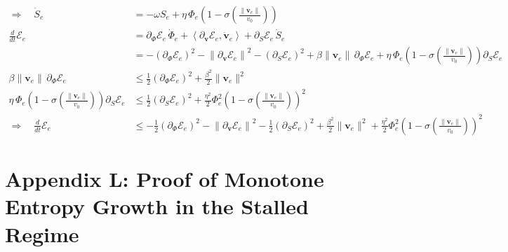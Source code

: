 \documentclass[11pt,oneside]{article}
\begin{document}
\begin{align}
\Rightarrow\quad
\dot{S}_e
&=
-\omega S_e
+
\eta\,\Phi_e
\left(1-\sigma\!\left(\frac{\|\mathbf{v}_e\|}{v_0}\right)\right)
\\[16pt]

\frac{d}{dt}\mathcal{E}_e
&=
\partial_{\Phi}\mathcal{E}_e\,\dot{\Phi}_e
+
\left\langle
\partial_{\mathbf{v}}\mathcal{E}_e,\dot{\mathbf{v}}_e
\right\rangle
+
\partial_S\mathcal{E}_e\,\dot{S}_e
\\[12pt]

&=
-\left(\partial_{\Phi}\mathcal{E}_e\right)^2
-\left\|
\partial_{\mathbf{v}}\mathcal{E}_e
\right\|^2
-\left(\partial_S\mathcal{E}_e\right)^2
+
\beta \|\mathbf{v}_e\|\,\partial_{\Phi}\mathcal{E}_e
+
\eta\,\Phi_e
\left(1-\sigma\!\left(\frac{\|\mathbf{v}_e\|}{v_0}\right)\right)
\partial_S\mathcal{E}_e
\\[14pt]

\beta \|\mathbf{v}_e\|\,\partial_{\Phi}\mathcal{E}_e
&\le
\frac{1}{2}\left(\partial_{\Phi}\mathcal{E}_e\right)^2
+\frac{\beta^2}{2}\|\mathbf{v}_e\|^2
\\[12pt]

\eta\,\Phi_e
\left(1-\sigma\!\left(\frac{\|\mathbf{v}_e\|}{v_0}\right)\right)
\partial_S\mathcal{E}_e
&\le
\frac{1}{2}\left(\partial_S\mathcal{E}_e\right)^2
+\frac{\eta^2}{2}\Phi_e^2
\left(1-\sigma\!\left(\frac{\|\mathbf{v}_e\|}{v_0}\right)\right)^2
\\[14pt]

\Rightarrow\quad
\frac{d}{dt}\mathcal{E}_e
&\le
-\frac{1}{2}\left(\partial_{\Phi}\mathcal{E}_e\right)^2
-\left\|
\partial_{\mathbf{v}}\mathcal{E}_e
\right\|^2
-\frac{1}{2}\left(\partial_S\mathcal{E}_e\right)^2
+
\frac{\beta^2}{2}\|\mathbf{v}_e\|^2
+
\frac{\eta^2}{2}\Phi_e^2
\left(1-\sigma\!\left(\frac{\|\mathbf{v}_e\|}{v_0}\right)\right)^2
\end{align}

\section{Appendix L: Proof of Monotone Entropy Growth in the Stalled Regime}
\end{document}

